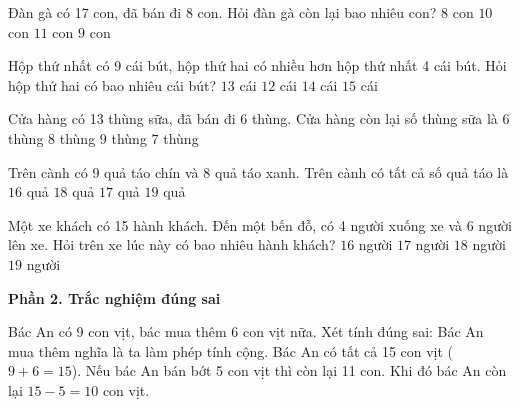 \begin{ex} %
Đàn gà có 17 con, đã bán đi 8 con. Hỏi đàn gà còn lại bao nhiêu con?
\choice
{$8$ con}
{$10$ con}
{$11$ con}
{\True $9$ con}
\end{ex}

\begin{ex} %
Hộp thứ nhất có 9 cái bút, hộp thứ hai có nhiều hơn hộp thứ nhất 4 cái bút. Hỏi hộp thứ hai có bao nhiêu cái bút?
\choice
{\True $13$ cái}
{$12$ cái}
{$14$ cái}
{$15$ cái}
\end{ex}

\begin{ex} %
Cửa hàng có 13 thùng sữa, đã bán đi 6 thùng. Cửa hàng còn lại số thùng sữa là
\choice
{$6$ thùng}
{$8$ thùng}
{$9$ thùng}
{\True $7$ thùng}
\end{ex}

\begin{ex} %
Trên cành có 9 quả táo chín và 8 quả táo xanh. Trên cành có tất cả số quả táo là
\choice
{$16$ quả}
{$18$ quả}
{\True $17$ quả}
{$19$ quả}
\end{ex}

\begin{ex} %
Một xe khách có 15 hành khách. Đến một bến đỗ, có 4 người xuống xe và 6 người lên xe. Hỏi trên xe lúc này có bao nhiêu hành khách?
\choice
{$16$ người}
{\True $17$ người}
{$18$ người}
{$19$ người}
\end{ex}

\textbf{Phần 2. Trắc nghiệm đúng sai}

\begin{ex} %
Bác An có 9 con vịt, bác mua thêm 6 con vịt nữa. Xét tính đúng sai:
\choiceTF
{\True Bác An mua thêm nghĩa là ta làm phép tính cộng.}
{\True Bác An có tất cả 15 con vịt ($9 + 6 = 15$).}
{Nếu bác An bán bớt 5 con vịt thì còn lại 11 con.}
{\True Khi đó bác An còn lại $15 - 5 = 10$ con vịt.}
\end{ex}

